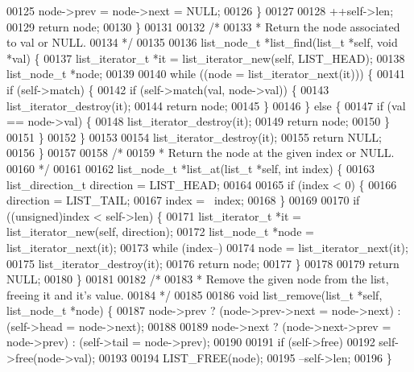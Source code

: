 \begin{DoxyCode}
00125     node->prev = node->next = NULL;
00126   \}
00127 
00128   ++\textcolor{keyword}{self}->len;
00129   \textcolor{keywordflow}{return} node;
00130 \}
00131 
00132 \textcolor{comment}{/*}
00133 \textcolor{comment}{ * Return the node associated to val or NULL.}
00134 \textcolor{comment}{ */}
00135 
00136 list_node_t *list_find(list_t *\textcolor{keyword}{self}, \textcolor{keywordtype}{void} *val) \{
00137   list_iterator_t *it = list_iterator_new(\textcolor{keyword}{self}, LIST_HEAD);
00138   list_node_t *node;
00139 
00140   \textcolor{keywordflow}{while} ((node = list_iterator_next(it))) \{
00141     \textcolor{keywordflow}{if} (self->match) \{
00142       \textcolor{keywordflow}{if} (self->match(val, node->val)) \{
00143         list_iterator_destroy(it);
00144         \textcolor{keywordflow}{return} node;
00145       \}
00146     \} \textcolor{keywordflow}{else} \{
00147       \textcolor{keywordflow}{if} (val == node->val) \{
00148         list_iterator_destroy(it);
00149         \textcolor{keywordflow}{return} node;
00150       \}
00151     \}
00152   \}
00153 
00154   list_iterator_destroy(it);
00155   \textcolor{keywordflow}{return} NULL;
00156 \}
00157 
00158 \textcolor{comment}{/*}
00159 \textcolor{comment}{ * Return the node at the given index or NULL.}
00160 \textcolor{comment}{ */}
00161 
00162 list_node_t *list_at(list_t *\textcolor{keyword}{self}, \textcolor{keywordtype}{int} index) \{
00163   list_direction_t direction = LIST_HEAD;
00164 
00165   \textcolor{keywordflow}{if} (index < 0) \{
00166     direction = LIST_TAIL;
00167     index = ~index;
00168   \}
00169 
00170   \textcolor{keywordflow}{if} ((\textcolor{keywordtype}{unsigned})index < self->len) \{
00171     list_iterator_t *it = list_iterator_new(\textcolor{keyword}{self}, direction);
00172     list_node_t *node = list_iterator_next(it);
00173     \textcolor{keywordflow}{while} (index--)
00174       node = list_iterator_next(it);
00175     list_iterator_destroy(it);
00176     \textcolor{keywordflow}{return} node;
00177   \}
00178 
00179   \textcolor{keywordflow}{return} NULL;
00180 \}
00181 
00182 \textcolor{comment}{/*}
00183 \textcolor{comment}{ * Remove the given node from the list, freeing it and it's value.}
00184 \textcolor{comment}{ */}
00185 
00186 \textcolor{keywordtype}{void} list_remove(list_t *\textcolor{keyword}{self}, list_node_t *node) \{
00187   node->prev ? (node->prev->next = node->next) : (self->head = node->next);
00188 
00189   node->next ? (node->next->prev = node->prev) : (self->tail = node->prev);
00190 
00191   \textcolor{keywordflow}{if} (self->free)
00192     \textcolor{keyword}{self}->free(node->val);
00193 
00194   LIST_FREE(node);
00195   --\textcolor{keyword}{self}->len;
00196 \}
\end{DoxyCode}
